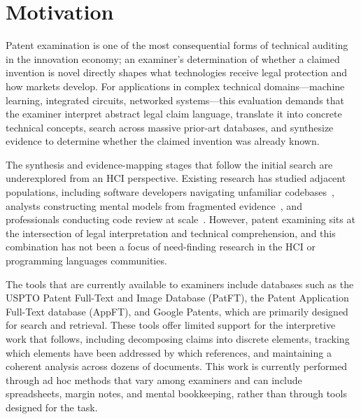 \documentclass[sigconf]{acmart}
\begin{document}


\maketitle


\section{Motivation}

Patent examination is one of the most consequential forms of technical auditing in the innovation economy; an examiner's determination of whether a claimed invention is novel directly shapes what technologies receive legal protection and how markets develop. For applications in complex technical domains---machine learning, integrated circuits, networked systems---this evaluation demands that the examiner interpret abstract legal claim language, translate it into concrete technical concepts, search across massive prior-art databases, and synthesize evidence to determine whether the claimed invention was already known.

The synthesis and evidence-mapping stages that follow the initial search are underexplored from an HCI perspective. Existing research has studied adjacent populations, including software developers navigating unfamiliar codebases~\cite{Ko2006}, analysts constructing mental models from fragmented evidence~\cite{Pirolli2005}, and professionals conducting code review at scale~\cite{Sadowski2018}. However, patent examining sits at the intersection of legal interpretation and technical comprehension, and this combination has not been a focus of need-finding research in the HCI or programming languages communities.

The tools that are currently available to examiners include databases such as the USPTO Patent Full-Text and Image Database (PatFT), the Patent Application Full-Text database (AppFT), and Google Patents, which are primarily designed for search and retrieval. These tools offer limited support for the interpretive work that follows, including decomposing claims into discrete elements, tracking which elements have been addressed by which references, and maintaining a coherent analysis across dozens of documents. This work is currently performed through ad hoc methods that vary among examiners and can include spreadsheets, margin notes, and mental bookkeeping, rather than through tools designed for the task.
\end{document}
